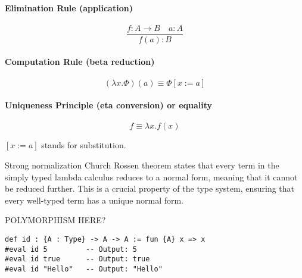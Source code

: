 \paragraph{Elimination Rule (application)}
\[
  \frac{f : A \to B \quad a : A}{f(a) : B}
\]

\paragraph{Computation Rule (beta reduction)}
\[
  (\lambda x. \Phi)(a) \equiv \Phi[x := a]
\]

\paragraph{Uniqueness Principle (eta conversion) or equality}
\[
  f \equiv \lambda x. f(x)
\]
\begin{notation}
  $[x := a]$ stands for substitution.
\end{notation}
Strong normalization Church Rossen theorem states that every term in the simply typed lambda calculus
reduces to a normal form, meaning that it cannot be reduced further.
This is a crucial property of the type system, ensuring that every well-typed term has a unique normal form.

POLYMORPHISM HERE?
\begin{example}
  \begin{lstlisting}[language=Lean] 
def id : {A : Type} -> A -> A := fun {A} x => x 
#eval id 5         -- Output: 5
#eval id true      -- Output: true  
#eval id "Hello"   -- Output: "Hello"
\end{lstlisting}
\end{example}
